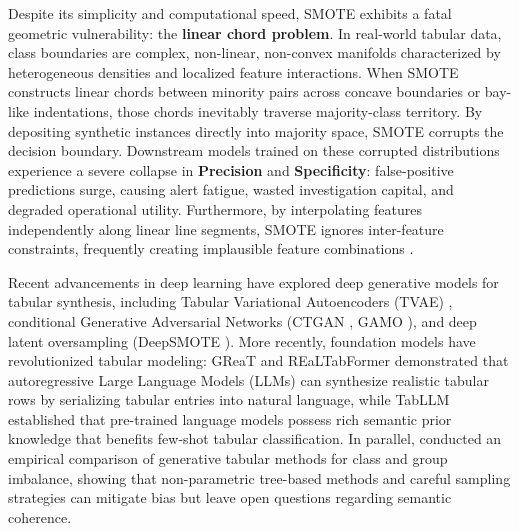 \documentclass[sn-basic]{sn-jnl}
\begin{document}
Despite its simplicity and computational speed, SMOTE exhibits a fatal geometric vulnerability: the \textbf{linear chord problem}. In real-world tabular data, class boundaries are complex, non-linear, non-convex manifolds characterized by heterogeneous densities and localized feature interactions. When SMOTE constructs linear chords between minority pairs across concave boundaries or bay-like indentations, those chords inevitably traverse majority-class territory. By depositing synthetic instances directly into majority space, SMOTE corrupts the decision boundary. Downstream models trained on these corrupted distributions experience a severe collapse in \textbf{Precision} and \textbf{Specificity}: false-positive predictions surge, causing alert fatigue, wasted investigation capital, and degraded operational utility. Furthermore, by interpolating features independently along linear line segments, SMOTE ignores inter-feature constraints, frequently creating implausible feature combinations \citep{dinsdale2021deepsmote}.

Recent advancements in deep learning have explored deep generative models for tabular synthesis, including Tabular Variational Autoencoders (TVAE) \citep{xu2019modeling}, conditional Generative Adversarial Networks (CTGAN \citep{xu2019modeling}, GAMO \citep{mullick2020generative}), and deep latent oversampling (DeepSMOTE \citep{dinsdale2021deepsmote}). More recently, foundation models have revolutionized tabular modeling: GReaT \citep{borisov2023language} and REaLTabFormer \citep{solatorio2023realtabformer} demonstrated that autoregressive Large Language Models (LLMs) can synthesize realistic tabular rows by serializing tabular entries into natural language, while TabLLM \citep{hegselmann2023tabllm} established that pre-trained language models possess rich semantic prior knowledge that benefits few-shot tabular classification. In parallel, \citet{panagiotou2024synthetic} conducted an empirical comparison of generative tabular methods for class and group imbalance, showing that non-parametric tree-based methods and careful sampling strategies can mitigate bias but leave open questions regarding semantic coherence.
\end{document}
